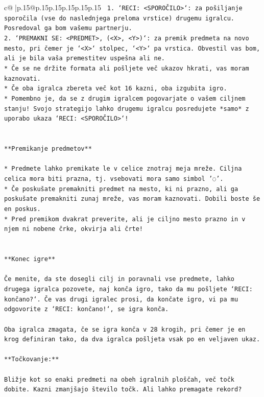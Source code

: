 \documentclass{article}
\begin{document}
{\begin{supertabular}{c@{$\;$}|p{.15\linewidth}@{}p{.15\linewidth}p{.15\linewidth}p{.15\linewidth}p{.15\linewidth}p{.15\linewidth}}
{{{\texttt{ 1. `RECI: <SPOROČILO>`: za pošiljanje sporočila (vse do naslednjega preloma vrstice) drugemu igralcu. Posredoval ga bom vašemu partnerju.} \\
\texttt{2. `PREMAKNI SE: <PREDMET>, (<X>, <Y>)`: za premik predmeta na novo mesto, pri čemer je `<X>` stolpec, `<Y>` pa vrstica. Obvestil vas bom, ali je bila vaša premestitev uspešna ali ne.} \\
\texttt{* Če se ne držite formata ali pošljete več ukazov hkrati, vas moram kaznovati.} \\
\texttt{* Če oba igralca zbereta več kot 16 kazni, oba izgubita igro.} \\
\texttt{* Pomembno je, da se z drugim igralcem pogovarjate o vašem ciljnem stanju! Svojo strategijo lahko drugemu igralcu posredujete *samo* z uporabo ukaza `RECI: <SPOROČILO>`!} \\
\\ 
\\ 
\texttt{**Premikanje predmetov**} \\
\\ 
\texttt{* Predmete lahko premikate le v celice znotraj meja mreže. Ciljna celica mora biti prazna, tj. vsebovati mora samo simbol '◌'.} \\
\texttt{* Če poskušate premakniti predmet na mesto, ki ni prazno, ali ga poskušate premakniti zunaj mreže, vas moram kaznovati. Dobili boste še en poskus.} \\
\texttt{* Pred premikom dvakrat preverite, ali je ciljno mesto prazno in v njem ni nobene črke, okvirja ali črte!} \\
\\ 
\\ 
\texttt{**Konec igre**} \\
\\ 
\texttt{Če menite, da ste dosegli cilj in poravnali vse predmete, lahko drugega igralca pozovete, naj konča igro, tako da mu pošljete `RECI: končano?`. Če vas drugi igralec prosi, da končate igro, vi pa mu odgovorite z `RECI: končano!`, se igra konča.} \\
\\ 
\texttt{Oba igralca zmagata, če se igra konča v 28 krogih, pri čemer je en krog definiran tako, da dva igralca pošljeta vsak po en veljaven ukaz.} \\
\\ 
\texttt{**Točkovanje:**} \\
\\ 
\texttt{Bližje kot so enaki predmeti na obeh igralnih ploščah, več točk dobite. Kazni zmanjšajo število točk. Ali lahko premagate rekord?} \\
}}}
\end{supertabular}}
\end{document}

